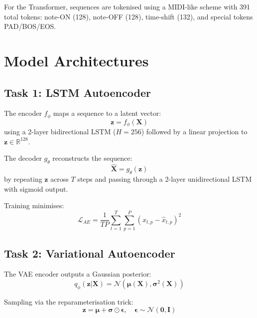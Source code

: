 \documentclass[conference]{IEEEtran}
\begin{document}
For the Transformer, sequences are tokenised using a MIDI-like
scheme with 391 total tokens: note-ON (128), note-OFF (128),
time-shift (132), and special tokens PAD/BOS/EOS.

\section{Model Architectures}

\subsection{Task 1: LSTM Autoencoder}

The encoder $f_\phi$ maps a sequence to a latent vector:
\begin{equation}
\mathbf{z} = f_\phi(\mathbf{X})
\end{equation}
using a 2-layer bidirectional LSTM ($H=256$) followed by a linear
projection to $\mathbf{z} \in \mathbb{R}^{128}$.

The decoder $g_\theta$ reconstructs the sequence:
\begin{equation}
\hat{\mathbf{X}} = g_\theta(\mathbf{z})
\end{equation}
by repeating $\mathbf{z}$ across $T$ steps and passing through a
2-layer unidirectional LSTM with sigmoid output.

Training minimises:
\begin{equation}
\mathcal{L}_{AE} = \frac{1}{TP}
\sum_{t=1}^{T}\sum_{p=1}^{P}\left(x_{t,p} - \hat{x}_{t,p}\right)^2
\end{equation}

\subsection{Task 2: Variational Autoencoder}

The VAE encoder outputs a Gaussian posterior:
\begin{equation}
q_\phi(\mathbf{z}|\mathbf{X}) = \mathcal{N}(\boldsymbol{\mu}(\mathbf{X}),
\boldsymbol{\sigma}^2(\mathbf{X}))
\end{equation}

Sampling via the reparameterisation trick:
\begin{equation}
\mathbf{z} = \boldsymbol{\mu} + \boldsymbol{\sigma} \odot \boldsymbol{\epsilon},
\quad \boldsymbol{\epsilon} \sim \mathcal{N}(\mathbf{0}, \mathbf{I})
\end{equation}
\end{document}
